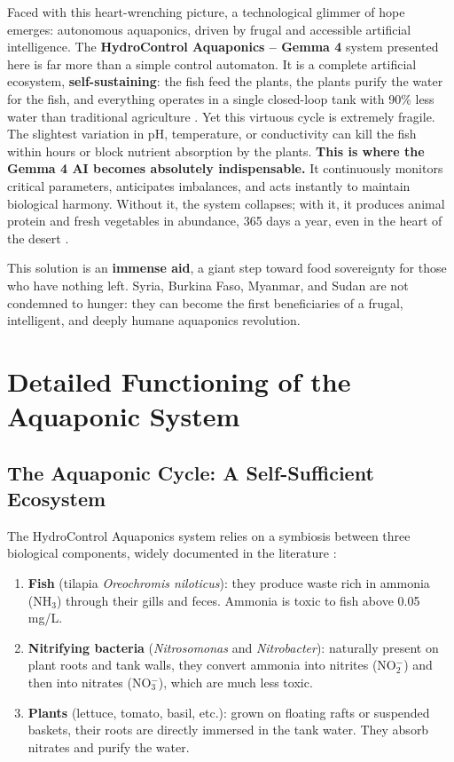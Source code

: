 \documentclass[12pt,a4paper]{article}
\begin{document}
Faced with this heart-wrenching picture, a technological glimmer of hope emerges: autonomous aquaponics, driven by frugal and accessible artificial intelligence. The \textbf{HydroControl Aquaponics -- Gemma 4} system presented here is far more than a simple control automaton. It is a complete artificial ecosystem, \textbf{self-sustaining}: the fish feed the plants, the plants purify the water for the fish, and everything operates in a single closed-loop tank with 90\% less water than traditional agriculture \cite{carotti2023}. Yet this virtuous cycle is extremely fragile. The slightest variation in pH, temperature, or conductivity can kill the fish within hours or block nutrient absorption by the plants. \textbf{This is where the Gemma 4 AI becomes absolutely indispensable.} It continuously monitors critical parameters, anticipates imbalances, and acts instantly to maintain biological harmony. Without it, the system collapses; with it, it produces animal protein and fresh vegetables in abundance, 365 days a year, even in the heart of the desert \cite{gemma4card}.

This solution is an \textbf{immense aid}, a giant step toward food sovereignty for those who have nothing left. Syria, Burkina Faso, Myanmar, and Sudan are not condemned to hunger: they can become the first beneficiaries of a frugal, intelligent, and deeply humane aquaponics revolution.

\section{Detailed Functioning of the Aquaponic System}

\subsection{The Aquaponic Cycle: A Self-Sufficient Ecosystem}

The HydroControl Aquaponics system relies on a symbiosis between three biological components, widely documented in the literature \cite{nitrification2021,tolerance2020}:

\begin{enumerate}[nosep]
    \item \textbf{Fish} (tilapia \textit{Oreochromis niloticus}): they produce waste rich in ammonia (NH$_3$) through their gills and feces. Ammonia is toxic to fish above 0.05 mg/L.
    \item \textbf{Nitrifying bacteria} (\textit{Nitrosomonas} and \textit{Nitrobacter}): naturally present on plant roots and tank walls, they convert ammonia into nitrites (NO$_2^-$) and then into nitrates (NO$_3^-$), which are much less toxic.
    \item \textbf{Plants} (lettuce, tomato, basil, etc.): grown on floating rafts or suspended baskets, their roots are directly immersed in the tank water. They absorb nitrates and purify the water.
\end{enumerate}
\end{document}
